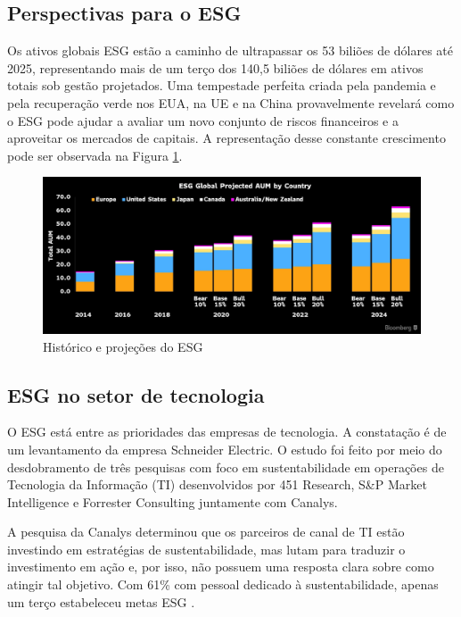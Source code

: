 \documentclass[12pt]{article}
\begin{document}
	\subsection*{Perspectivas para o ESG}
	
	Os ativos globais ESG estão a caminho de ultrapassar os 53 biliões de dólares até 2025, representando mais de um terço dos 140,5 biliões de dólares em ativos totais sob gestão projetados. Uma tempestade perfeita criada pela pandemia e pela recuperação verde nos EUA, na UE e na China provavelmente revelará como o ESG pode ajudar a avaliar um novo conjunto de riscos financeiros e a aproveitar os mercados de capitais. A representação desse constante crescimento pode ser observada na Figura \ref{fig:projections}.
	
	\begin{figure}[h]
		\centering
		\includegraphics[scale=0.2]{pictures/esg-projections.png}
		\caption{Histórico e projeções do ESG}
		\label{fig:projections}
	\end{figure}
	
	\subsection*{ESG no setor de tecnologia}
	
	O ESG está entre as prioridades das empresas de tecnologia. A constatação é de um levantamento da empresa Schneider Electric. O estudo foi feito por meio do desdobramento de três pesquisas com foco em sustentabilidade em operações de Tecnologia da Informação (TI) desenvolvidos por 451 Research, S\&P Market Intelligence e Forrester Consulting juntamente com Canalys.
	
	A pesquisa da Canalys determinou que os parceiros de canal de TI estão investindo em estratégias de sustentabilidade, mas lutam para traduzir o investimento em ação e, por isso, não possuem uma resposta clara sobre como atingir tal objetivo. Com 61\% com pessoal dedicado à sustentabilidade, apenas um terço estabeleceu metas ESG \cite{luizgustavopaceteESGPrioridadePara2022}.
	
\end{document}
